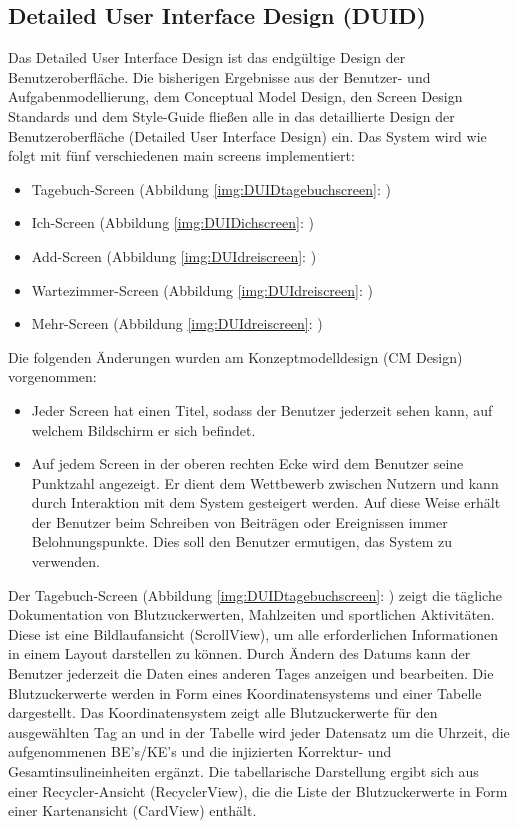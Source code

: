 \subsection{Detailed User Interface Design (DUID)}
	Das Detailed User Interface Design ist das endgültige Design der Benutzeroberfläche. Die bisherigen Ergebnisse aus der Benutzer- und Aufgabenmodellierung, dem Conceptual Model Design, den Screen Design Standards und dem Style-Guide fließen alle in das detaillierte Design der Benutzeroberfläche (Detailed User Interface Design) ein.\newline
	Das System wird wie folgt mit fünf verschiedenen main screens implementiert:
\begin{itemize}
	\item Tagebuch-Screen (Abbildung \ref{img:DUIDtagebuchscreen}: )
	\item Ich-Screen (Abbildung \ref{img:DUIDichscreen}: )
	\item Add-Screen (Abbildung \ref{img:DUIdreiscreen}: )
	\item Wartezimmer-Screen (Abbildung \ref{img:DUIdreiscreen}: )
	\item Mehr-Screen (Abbildung \ref{img:DUIdreiscreen}: )
\end{itemize}
Die folgenden Änderungen wurden am Konzeptmodelldesign (CM Design) vorgenommen:
\begin{itemize}
	\item Jeder Screen hat einen Titel, sodass der Benutzer jederzeit sehen kann, auf welchem Bildschirm er sich befindet.
	\item Auf jedem Screen in der oberen rechten Ecke wird dem Benutzer seine Punktzahl angezeigt. Er dient dem Wettbewerb zwischen Nutzern und kann durch Interaktion mit dem System gesteigert werden. Auf diese Weise erhält der Benutzer beim Schreiben von Beiträgen oder Ereignissen immer Belohnungspunkte. Dies soll den Benutzer ermutigen, das System zu verwenden.
\end{itemize}
	Der Tagebuch-Screen (Abbildung \ref{img:DUIDtagebuchscreen}: ) zeigt die tägliche Dokumentation von Blutzuckerwerten, Mahlzeiten und sportlichen Aktivitäten. Diese ist eine Bildlaufansicht (ScrollView), um alle erforderlichen Informationen in einem Layout darstellen zu können. Durch Ändern des Datums kann der Benutzer jederzeit die Daten eines anderen Tages anzeigen und bearbeiten. Die Blutzuckerwerte werden in Form eines Koordinatensystems und einer Tabelle dargestellt. Das Koordinatensystem zeigt alle Blutzuckerwerte für den ausgewählten Tag an und in der Tabelle wird jeder Datensatz um die Uhrzeit, die aufgenommenen BE's/KE's und die injizierten Korrektur- und Gesamtinsulineinheiten ergänzt. Die tabellarische Darstellung ergibt sich aus einer Recycler-Ansicht (RecyclerView), die die Liste der Blutzuckerwerte in Form einer Kartenansicht (CardView) enthält.\newline

